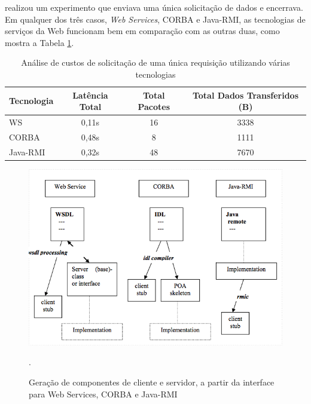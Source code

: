 \documentclass[
	12pt,				%
	oneside,			%
	a4paper,			%
	english,			%
	brazil				%
	]{abntex2ppgsi}
\begin{document}
 realizou um experimento que enviava uma única solicitação de dados e encerrava. Em qualquer dos três casos, \textit{Web Services}, CORBA e Java-RMI, as tecnologias de serviços da Web funcionam bem em comparação com as outras duas, como mostra a Tabela \ref{tbComparacaoWS_CORBA_RMI}.

\begin{table}[h!]
	\centering
	\caption{Análise de custos de solicitação de uma única requisição utilizando várias tecnologias\cite{gray2004comparison}}
	\label{tbComparacaoWS_CORBA_RMI}
	\begin{tabular}{|l | c|c|c|}
		\hline
		\rowcolor[gray]{0.7}
		Tecnologia & Latência Total  & Total Pacotes  & Total Dados Transferidos (B)  \\ \hline
		WS              & 0,11s & 16 & 3338  \\ \hline
		CORBA        & 0,48s & 8 & 1111  \\ \hline
		Java-RMI     & 0,32s & 48 & 7670  \\ \hline
	\end{tabular}
\end{table}


\begin{figure}[h!]
	\centering
	\includegraphics[width=0.8\columnwidth]{images/estrutura_comunicacao.png}
	\caption{Geração de componentes de cliente e servidor, a partir da interface para Web Services, CORBA e Java-RMI \cite{gray2004comparison}}.
	\label{fig:estrutura_comunicacao}
\end{figure}
\end{document}
